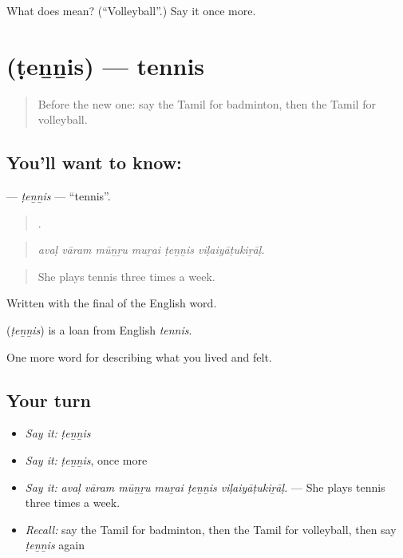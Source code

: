\begin{tcolorbox}[breakable,colback=teal!4,colframe=teal!35!black,title={Before you move on}]
What does  mean? (\textquotedblleft{}Volleyball\textquotedblright{}.) Say it once more.
\end{tcolorbox}
\section[\texorpdfstring{\ta{டென்னிஸ்} (ṭeṉṉis)}{டென்னிஸ் (ṭeṉṉis)}]{ (ṭeṉṉis) — tennis}

\label{lesson:TA-C531-tennis}



\begin{quote}
Before the new one: say the Tamil for badminton, then the Tamil for volleyball.
\end{quote}

\subsection*{You'll want to know: }
\textbf{} — \emph{ṭeṉṉis} — \textquotedblleft{}tennis\textquotedblright{}.

\begin{quote}
     .
\end{quote}

\begin{quote}
\emph{avaḷ vāram mūṉṟu muṟai ṭeṉṉis viḷaiyāṭukiṟāḷ.}
\end{quote}

\begin{quote}
She plays tennis three times a week.
\end{quote}

Written with the final  of the English word.

\begin{cousinweb}
\textbf{} (\emph{ṭeṉṉis}) is a loan from English \emph{tennis}.
\end{cousinweb}

\begin{grammarlens}[title={What you've built}]
One more word for describing what you lived and felt.
\end{grammarlens}

\subsection*{Your turn}
\begin{itemize}
\raggedright
  \item \emph{Say it:} \emph{ṭeṉṉis}
  \item \emph{Say it:} \emph{ṭeṉṉis}, once more
  \item \emph{Say it:} \emph{avaḷ vāram mūṉṟu muṟai ṭeṉṉis viḷaiyāṭukiṟāḷ.} — She plays tennis three times a week.
  \item \emph{Recall:} say the Tamil for badminton, then the Tamil for volleyball, then say \emph{ṭeṉṉis} again
\end{itemize}

